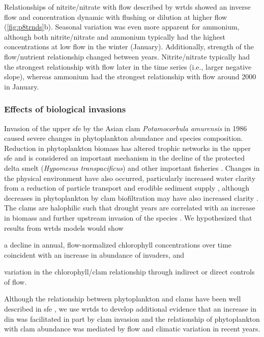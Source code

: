 \documentclass[letterpaper,12pt,oneside]{article}\usepackage[]{graphicx}\usepackage[]{color}
\begin{document}
Relationships of nitrite/nitrate with flow described by \ac{wrtds} showed an inverse flow and concentration dynamic with flushing or dilution at higher flow (\cref{fig:p8trnds}b).  Seasonal variation was even more apparent for ammonium, although both nitrite/nitrate and ammonium typically had the highest concentrations at low flow in the winter (January).  Additionally, strength of the flow/nutrient relationship changed between years. Nitrite/nitrate typically had the strongest relationship with flow later in the time series (i.e., larger negative slope), whereas ammonium had the strongest relationship with flow around 2000 in January. 

\subsubsection{Effects of biological invasions}

Invasion of the upper \ac{sfe} by the Asian clam \textit{Potamocorbula amurensis} in 1986 caused severe changes in phytoplankton abundance and species composition.  Reduction in phytoplankton biomass has altered trophic networks in the upper \ac{sfe} and is considered an important mechanism in the decline of the protected delta smelt (\textit{Hypomesus transpacificus}) and other important fisheries \citep{Feyrer03,MacNally10}.  Changes in the physical environment have also occurred, particularly increased water clarity from a reduction of particle transport and erodible sediment supply \citep{Jassby08,Schoellhamer11,Cloern12b}, although decreases in phytoplankton by clam biofiltration may have also increased clarity \citep{MacNally10}. The clams are halophilic such that drought years are correlated with an increase in biomass and further upstream invasion of the species \citep{Parchaso02,Cloern12b}. We hypothesized that results from \ac{wrtds} models would show \begin{inparaenum}[1\upshape)]
\item a decline in annual, flow-normalized chlorophyll concentrations over time coincident with an increase in abundance of invaders, and
\item variation in the chlorophyll/clam relationship through indirect or direct controls of flow.
\end{inparaenum}
Although the relationship between phytoplankton and clams have been well described in \ac{sfe} \citep{Kimmerer14}, we use \ac{wrtds} to develop additional evidence that an increase in \ac{din} was facilitated in part by clam invasion and the relationship of phytoplankton with clam abundance was mediated by flow and climatic variation in recent years.
\end{document}
